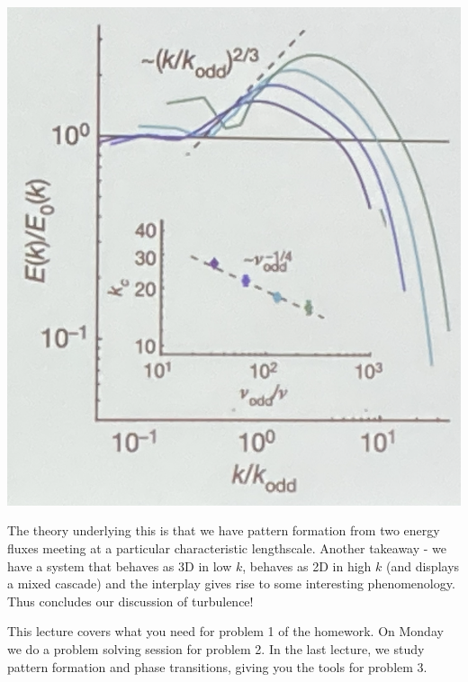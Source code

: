 \begin{center}
    \includegraphics[scale=0.3]{Lectures/Images/lec16-nuscaling.png}
\end{center}

The theory underlying this is that we have pattern formation from two energy fluxes meeting at a particular characteristic lengthscale. Another takeaway - we have a system that behaves as 3D in low $k$, behaves as 2D in high $k$ (and displays a mixed cascade) and the interplay gives rise to some interesting phenomenology. Thus concludes our discussion of turbulence!

This lecture covers what you need for problem 1 of the homework. On Monday we do a problem solving session for problem 2. In the last lecture, we study pattern formation and phase transitions, giving you the tools for problem 3.